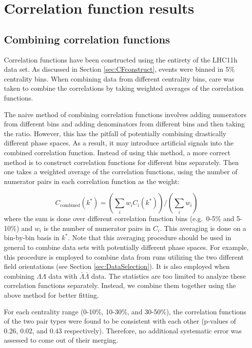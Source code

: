 \section{Correlation function results}
\label{sec:CorrelationFunctionResults}
\subsection{Combining correlation functions}
\label{sec:CFCombining}

Correlation functions have been constructed using the entirety of the LHC11h data set.  
As discussed in Section \ref{sec:CFconstruct}, events were binned in 5\% centrality bins.  
When combining data from different centrality bins, care was taken to combine the correlations by taking weighted averages of the correlation functions.  

The naive method of combining correlation functions involves adding numerators from different bins and adding denominators from different bins and then taking the ratio.  
However, this has the pitfall of potentially combining drastically different phase spaces.  
As a result, it may introduce artificial signals into the combined correlation function.  
Instead of using this method, a more correct method is to construct correlation functions for different bins separately.  
Then one takes a weighted average of the correlation functions, using the number of numerator pairs in each correlation function as the weight:

\begin{equation}
\label{eq:CombineCF}
C_\mathrm{combined}(k^*) = (\displaystyle\sum\limits_{i} w_i C_i(k^*))/(\displaystyle\sum\limits_{i} w_i)
\end{equation}
where the sum is done over different correlation function bins (e.g.\ 0-5\% and 5-10\%) and $w_i$ is the number of numerator pairs in $C_i$.  
This averaging is done on a bin-by-bin basis in $k^*$.  
Note that this averaging procedure should be used in general to combine data sets with potentially different phase spaces. 
For example, this procedure is employed to combine data from runs utilizing the two different field orientations (see Section \ref{sec:DataSelection}).  
It is also employed when combining $\Lambda\Lambda$ data with $\bar{\Lambda}\bar{\Lambda}$ data.  
The statistics are too limited to analyze these correlation functions separately. Instead, we combine them together using the above method for better fitting.

For each centrality range (0-10\%, 10-30\%, and 30-50\%), the correlation functions of the two pair types were found to be consistent with each other (p-values of 0.26, 0.02, and 0.43 respectively).  
Therefore, no additional systematic error was assessed to come out of their merging.


